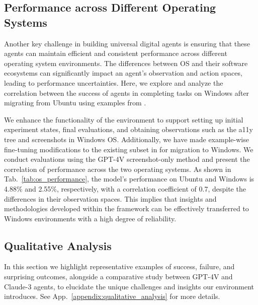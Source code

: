 \subsection{Performance across Different Operating Systems}
Another key challenge in building universal digital agents is ensuring that these agents can maintain efficient and consistent performance across different operating system environments. 
The differences between OS and their software ecosystems can significantly impact an agent's observation and action spaces, leading to performance uncertainties. 
Here, we explore and analyze the correlation between the success of agents in completing tasks on Windows after migrating from Ubuntu using examples from \ours.

\begin{table}
\vspace{-0.1in}
\caption{Comparison of model performance and correlation across operating systems.}  
\centering
{}
\vspace{-0.1in}
\label{tab:os_performance}
\end{table}

We enhance the functionality of the \ours environment to support setting up initial experiment states, final evaluations, and obtaining observations such as the a11y tree and screenshots in Windows OS.
Additionally, we have made example-wise fine-tuning modifications to the existing subset in \ours for migration to Windows. 
We conduct evaluations using the GPT-4V screenshot-only method and present the correlation of performance across the two operating systems. 
As shown in Tab.~\ref{tab:os_performance}, the model's performance on Ubuntu and Windows is 4.88\% and 2.55\%, respectively, with a correlation coefficient of 0.7, despite the differences in their observation spaces.
This implies that insights and methodologies developed within the \ours framework can be effectively transferred to Windows environments with a high degree of reliability.

\subsection{Qualitative Analysis}
\label{qualitative_analysis}
In this section we highlight representative examples of success, failure, and surprising outcomes, alongside a comparative study between GPT-4V and Claude-3 agents, to elucidate the unique challenges and insights our environment introduces. 
See App.~\ref{appendix:qualitative_analysis} for more details.

